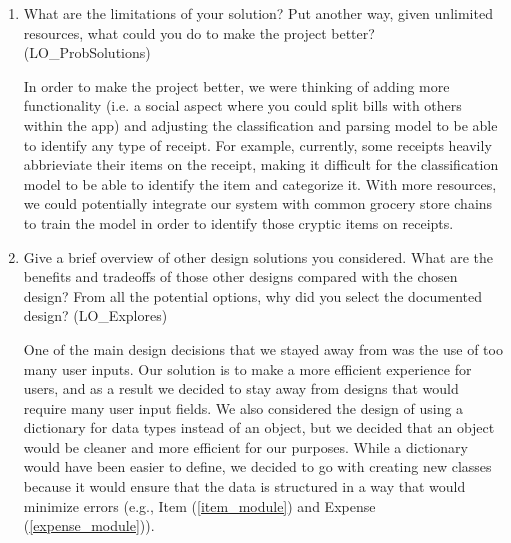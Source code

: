 \documentclass[12pt, titlepage]{article}
\begin{document}
\begin{enumerate}
  \item What are the limitations of your solution?  Put another way, given
  unlimited resources, what could you do to make the project better? (LO\_ProbSolutions)

  In order to make the project better, we were thinking of adding more functionality (i.e. a social aspect where you could split bills with others within the app) and adjusting the classification
  and parsing model to be able to identify any type of receipt. For example, currently, some receipts heavily abbrieviate their items on the receipt, making it difficult for the classification model
  to be able to identify the item and categorize it. With more resources, we could potentially integrate our system with common grocery store chains to train the model in order to identify those
  cryptic items on receipts.

  \item Give a brief overview of other design solutions you considered.  What
  are the benefits and tradeoffs of those other designs compared with the chosen
  design?  From all the potential options, why did you select the documented design?
  (LO\_Explores)

  One of the main design decisions that we stayed away from was the use of too
  many user inputs. Our solution is to make a more efficient experience for
  users, and as a result we decided to stay away from designs that would require
  many user input fields. We also considered the design of using a dictionary
  for data types instead of an object, but we decided that an object would be
  cleaner and more efficient for our purposes. While a dictionary would have
  been easier to define, we decided to go with creating new classes because it
  would ensure that the data is structured in a way that would minimize errors
  (e.g., Item (\ref{item_module}) and Expense (\ref{expense_module})).

\end{enumerate}
\end{document}

